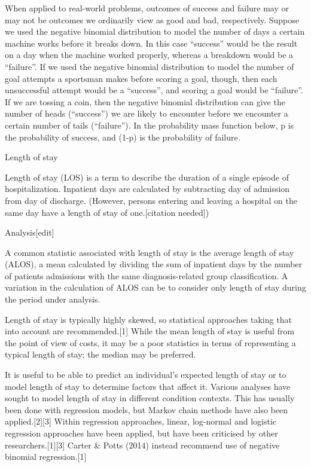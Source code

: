 When applied to real-world problems, outcomes of success and failure may or may not be outcomes we ordinarily view as good and bad, respectively. Suppose we used the negative binomial distribution to model the number of days a certain machine works before it breaks down. In this case “success” would be the result on a day when the machine worked properly, whereas a breakdown would be a “failure”. If we used the negative binomial distribution to model the number of goal attempts a sportsman makes before scoring a goal, though, then each unsuccessful attempt would be a “success”, and scoring a goal would be “failure”. If we are tossing a coin, then the negative binomial distribution can give the number of heads (“success”) we are likely to encounter before we encounter a certain number of tails (“failure”). In the probability mass function below, p is the probability of success, and (1-p) is the probability of failure.


Length of stay

Length of stay (LOS) is a term to describe the duration of a single episode of hospitalization. Inpatient days are calculated by subtracting day of admission from day of discharge. (However, persons entering and leaving a hospital on the same day have a length of stay of one.[citation needed])
 

Analysis[edit]
 
A common statistic associated with length of stay is the average length of stay (ALOS), a mean calculated by dividing the sum of inpatient days by the number of patients admissions with the same diagnosis-related group classification. A variation in the calculation of ALOS can be to consider only length of stay during the period under analysis.
 
Length of stay is typically highly skewed, so statistical approaches taking that into account are recommended.[1] While the mean length of stay is useful from the point of view of costs, it may be a poor statistics in terms of representing a typical length of stay; the median may be preferred.
 
It is useful to be able to predict an individual's expected length of stay or to model length of stay to determine factors that affect it. Various analyses have sought to model length of stay in different condition contexts. This has usually been done with regression models, but Markov chain methods have also been applied.[2][3] Within regression approaches, linear, log-normal and logistic regression approaches have been applied, but have been criticised by other researchers.[1][3] Carter & Potts (2014) instead recommend use of negative binomial regression.[1]
 
